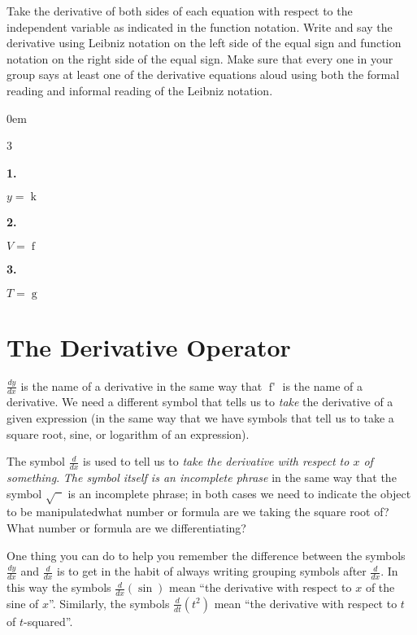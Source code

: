 \documentclass[12pt,]{book}
\theoremstyle{plain}
\theoremstyle{definition}
\numberwithin{equation}{section}
\newenvironment{exercisegroup}%
{\medskip\noindent}%
{\par\bigskip}%
\newlength{\exercisegroupindent}%
\newlength{\exercisegroupitemwidth}%
\newenvironment{exercisegrouplist}%
{\vspace{-\partopsep}%
\begin{adjustwidth}{\exercisegroupindent}{0em}}%
{\end{adjustwidth}%
\vspace{-\partopsep}%
\vspace{\baselineskip}}%
\newenvironment{exercisegroupbycol}[1]%
{\begin{exercisegrouplist}%
\vspace{-\multicolsep}%
\begin{multicols}{#1}%
\setlength{\parindent}{0em}%
\setlength{\exercisegroupitemwidth}{\linewidth}}%
{\end{multicols}%
\vspace{-\multicolsep}%
\end{exercisegrouplist}}%
\newenvironment{exercisegroupitem}[1]%
{\begin{minipage}[t]{\exercisegroupitemwidth}
\vspace{0pt}%
{\bfseries#1}%
\rule{0pt}{\baselineskip}}{\strut%
\end{minipage}%
\hspace{\columnsep}}%
\providecommand\phantomsection{}
\newcommand{\fe}[2]{\mathop{{#1}{\left(#2\right)}}}
\newcommand{\fd}[1]{#1'}
\newcommand{\lz}[2]{\frac{d#1}{d#2}}
\newcommand{\lzo}[1]{\frac{d}{d#1}}
\newcommand{\lzoo}[2]{{\frac{d}{d#1}}{\left(#2\right)}}
\begin{document}
\begin{exercisegroup}%
Take the derivative of both sides of each equation with respect to the independent variable as indicated in the function notation.  Write and say the derivative using Leibniz notation on the left side of the equal sign and function notation on the right side of the equal sign.  Make sure that every one in your group says at least one of the derivative equations aloud using both the formal reading and informal reading of the Leibniz notation.%
\begin{exercisegroupbycol}{3}%
\begin{exercisegroupitem}{1. }\phantomsection\hypertarget{exercise-222}{\null}
\(y=\fe{k}{t}\)%
\end{exercisegroupitem}%
\par%
\begin{exercisegroupitem}{2. }\phantomsection\hypertarget{exercise-223}{\null}
\(V=\fe{f}{r}\)%
\end{exercisegroupitem}%
\par%
\begin{exercisegroupitem}{3. }\phantomsection\hypertarget{exercise-224}{\null}
\(T=\fe{g}{P}\)%
\end{exercisegroupitem}%
\par%
\end{exercisegroupbycol}%
\end{exercisegroup}%
\typeout{************************************************}
\typeout{************************************************}
\section[The Derivative Operator]{The Derivative Operator}\label{section-derivative-operator}
\(\lz{y}{x}\) is the name of a derivative in the same way that \(\fe{\fd{f}}{x}\) is the name of a derivative.  We need a different symbol that tells us to \emph{take} the derivative of a given expression (in the same way that we have symbols that tell us to take a square root, sine, or  logarithm of an expression).%
\par
The symbol \(\lzo{x}\) is used to tell us to \emph{take the derivative with respect to \(x\) of something}. \emph{The symbol itself is an incomplete phrase} in the same way that the symbol \(\sqrt{\phantom{x}}\) is an incomplete phrase; in both cases we need to indicate the object to be manipulated\textemdash{}what number or formula are we taking the square root of? What number or formula  are we differentiating?%
\par
One thing you can do to help you remember the difference between the symbols \(\lz{y}{x}\) and \(\lzo{x}\) is to get in the habit of always writing grouping symbols after \(\lzo{x}\).  In this way the symbols \(\lzoo{x}{\fe{\sin}{x}}\) mean ``the derivative with respect to \(x\) of the sine of \(x\)''.  Similarly, the symbols \(\lzoo{t}{t^2}\) mean ``the derivative with respect to \(t\) of \(t\)-squared''.%
\typeout{************************************************}
\typeout{************************************************}
\end{document}
